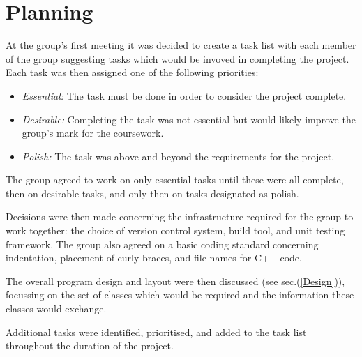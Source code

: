\section{Planning}
\label{Planning}

At the group's first meeting it was decided to create a task list with each member of the group suggesting tasks which would be invoved in completing the project.  Each task was then assigned one of the following priorities:

\begin{itemize}
	\item \textit{Essential:} The task must be done in order to consider the project complete.
	\item \textit{Desirable:} Completing the task was not essential but would likely improve the group's mark for the coursework.
	\item \textit{Polish:} The task was above and beyond the requirements for the project.
\end{itemize}

The group agreed to work on only essential tasks until these were all complete, then on desirable tasks, and only then on tasks designated as polish.

Decisions were then made concerning the infrastructure required for the group to work together: the choice of version control system, build tool, and unit testing framework. The group also agreed on a basic coding standard concerning indentation, placement of curly braces, and file names for C++ code.

The overall program design and layout were then discussed (see sec.(\ref{Design})), focussing on the set of classes which would be required and the information these classes would exchange.

Additional tasks were identified, prioritised, and added to the task list throughout the duration of the project.

